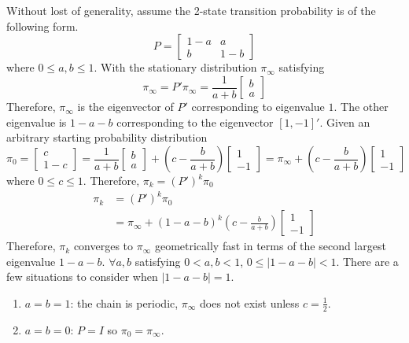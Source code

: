 \documentclass[a4paper, 11pt]{article}
\begin{document}
Without lost of generality, assume the 2-state transition probability is of the following form. 
\begin{equation}
P = \begin{bmatrix}
1-a & a \\
b & 1-b
\end{bmatrix}
\end{equation}
where $0 \leq a, b \leq 1$. With the stationary distribution $\pi_\infty$ satisfying 
\begin{equation}
\pi_\infty = P' \pi_\infty = \frac{1}{a+b}\begin{bmatrix}
b \\
a
\end{bmatrix}
\end{equation}
Therefore, $\pi_\infty$ is the eigenvector of $P'$ corresponding to eigenvalue $1$. The other eigenvalue is $1-a-b$ corresponding to the eigenvector $[1, -1]'$. Given an arbitrary starting probability distribution 
\begin{equation}
\pi_0 = \begin{bmatrix}
c \\
1-c
\end{bmatrix} = \frac{1}{a+b}\begin{bmatrix}
b \\
a
\end{bmatrix} + \left(c - \frac{b}{a+b} \right)\begin{bmatrix}
1 \\
-1
\end{bmatrix} = \pi_\infty + \left(c - \frac{b}{a+b} \right)\begin{bmatrix}
1 \\
-1
\end{bmatrix}
\end{equation}
where $0 \leq c \leq 1$. Therefore, $\pi_k = (P')^k \pi_0$
\begin{equation}
\begin{split}
\pi_k & = (P')^k \pi_0 \\ 
 & = \pi_\infty + (1-a-b)^k\left(c - \frac{b}{a+b} \right)\begin{bmatrix}
1 \\
-1
\end{bmatrix}
\end{split}
\end{equation}
Therefore, $\pi_k$ converges to $\pi_\infty$ geometrically fast in terms of the second largest eigenvalue $1-a-b$. $\forall a,b$ satisfying $0 < a, b < 1$, $0 \leq |1-a-b| < 1$. There are a few situations to consider when $|1-a-b| = 1$. 
\begin{enumerate}
	\item $a=b=1$: the chain is periodic, $\pi_\infty$ does not exist unless $c=\frac{1}{2}$. 
	\item $a=b=0$: $P=I$ so $\pi_0 = \pi_\infty$.
\end{enumerate}
\end{document}
